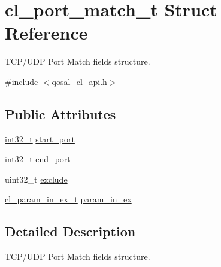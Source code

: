 \hypertarget{structcl__port__match__t}{\section{cl\-\_\-port\-\_\-match\-\_\-t Struct Reference}
\label{structcl__port__match__t}
}


T\-C\-P/\-U\-D\-P Port Match fields structure.  




{\ttfamily \#include $<$qosal\-\_\-cl\-\_\-api.\-h$>$}

\subsection*{Public Attributes}
\begin{DoxyCompactItemize}
\item 
\hyperlink{commondefs_8h_a32f2e37ee053cf2ce8ca28d1f74630e5}{int32\-\_\-t} \hyperlink{structcl__port__match__t_a4f712b7d51dae753194f9fd577312087}{start\-\_\-port}
\item 
\hyperlink{commondefs_8h_a32f2e37ee053cf2ce8ca28d1f74630e5}{int32\-\_\-t} \hyperlink{structcl__port__match__t_ab60b9e124c5fab2e386db5c56ca0b29e}{end\-\_\-port}
\item 
uint32\-\_\-t \hyperlink{structcl__port__match__t_ac56f054e94afc53e86dd1cb2b30002f1}{exclude}
\item 
\hyperlink{structcl__param__in__ex__t}{cl\-\_\-param\-\_\-in\-\_\-ex\-\_\-t} \hyperlink{structcl__port__match__t_a3138505b41869c1e025ecd89a9c51254}{param\-\_\-in\-\_\-ex}
\end{DoxyCompactItemize}


\subsection{Detailed Description}
T\-C\-P/\-U\-D\-P Port Match fields structure. 

